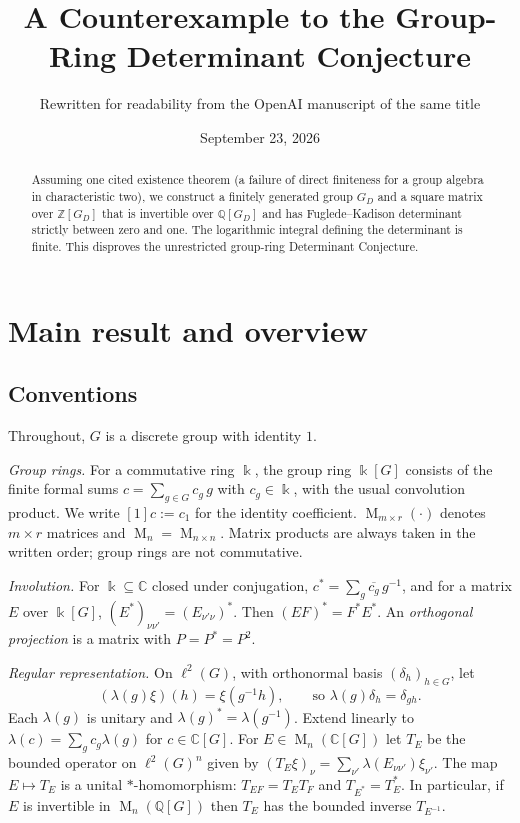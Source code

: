 \documentclass[11pt]{article}
\title{A Counterexample to the Group-Ring Determinant Conjecture}
\author{Rewritten for readability from the OpenAI manuscript of the same title}
\date{September 23, 2026}
\theoremstyle{remark}
\numberwithin{equation}{section}
\newcommand{\Z}{\mathbb Z}
\newcommand{\Q}{\mathbb Q}
\newcommand{\C}{\mathbb C}
\newcommand{\Mat}{\operatorname{M}}
\begin{document}
\maketitle
\begin{abstract}
Assuming one cited existence theorem (a failure of direct finiteness for a group algebra in characteristic two), we construct a finitely generated group $G_D$ and a square matrix over $\Z[G_D]$ that is invertible over $\Q[G_D]$ and has Fuglede--Kadison determinant strictly between zero and one. The logarithmic integral defining the determinant is finite. This disproves the unrestricted group-ring Determinant Conjecture.
\end{abstract}

\section{Main result and overview}
\label{sec:introduction}

\subsection{Conventions}

Throughout, $G$ is a discrete group with identity $1$.

\emph{Group rings.} For a commutative ring $\Bbbk$, the group ring $\Bbbk[G]$ consists of the finite formal sums $c=\sum_{g\in G}c_g\,g$ with $c_g\in\Bbbk$, with the usual convolution product. We write $[1]c:=c_1$ for the identity coefficient. $\Mat_{m\times r}(\cdot)$ denotes $m\times r$ matrices and $\Mat_n=\Mat_{n\times n}$. Matrix products are always taken in the written order; group rings are not commutative.

\emph{Involution.} For $\Bbbk\subseteq\C$ closed under conjugation, $c^*=\sum_g\overline{c_g}\,g^{-1}$, and for a matrix $E$ over $\Bbbk[G]$, $(E^*)_{\nu\nu'}=(E_{\nu'\nu})^*$. Then $(EF)^*=F^*E^*$. An \emph{orthogonal projection} is a matrix with $P=P^*=P^2$.

\emph{Regular representation.} On $\ell^2(G)$, with orthonormal basis $(\delta_h)_{h\in G}$, let
\[
 (\lambda(g)\xi)(h)=\xi(g^{-1}h),\qquad\text{so }\lambda(g)\delta_h=\delta_{gh}.
\]
Each $\lambda(g)$ is unitary and $\lambda(g)^*=\lambda(g^{-1})$. Extend linearly to $\lambda(c)=\sum_gc_g\lambda(g)$ for $c\in\C[G]$. For $E\in\Mat_n(\C[G])$ let $T_E$ be the bounded operator on $\ell^2(G)^n$ given by $(T_E\xi)_\nu=\sum_{\nu'}\lambda(E_{\nu\nu'})\xi_{\nu'}$. The map $E\mapsto T_E$ is a unital $*$-homomorphism: $T_{EF}=T_ET_F$ and $T_{E^*}=T_E^*$. In particular, if $E$ is invertible in $\Mat_n(\Q[G])$ then $T_E$ has the bounded inverse $T_{E^{-1}}$.
\end{document}
